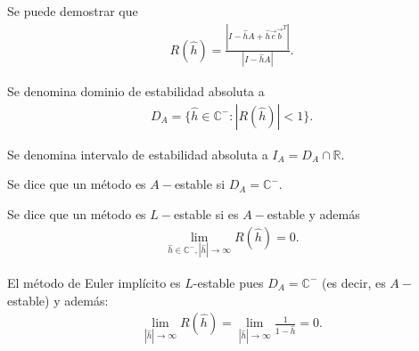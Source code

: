 \begin{obs}
    Se puede demostrar que
    \begin{align*}
        R(\hat{h}) = \frac{|I - \hat{h}A + \hat{h}\overrightarrow{e}\overrightarrow{b}^T|}{|I - \hat{h}A|}.
    \end{align*}
\end{obs}

\begin{defi}
    Se denomina dominio de estabilidad absoluta a
    \begin{align*}
        D_A = \{ \hat{h} \in \mathbb{C}^- : |R(\hat{h})| < 1\}.
    \end{align*}
\end{defi}

\begin{defi}
    Se denomina intervalo de estabilidad absoluta a $I_A = D_A \cap \mathbb{R}$.
\end{defi}

\begin{defi}
    Se dice que un método es $A-$estable si $D_A = \mathbb{C}^-$.
\end{defi}

\begin{defi}
    Se dice que un método es $L-$estable si es $A-$estable y además
    \begin{align*}
        \lim_{\hat{h} \in\mathbb{C}^-, |\hat{h}| \to \infty} R(\hat{h}) = 0.
    \end{align*}
\end{defi}

\begin{ejemplo}
    El método de Euler implícito es $L$-estable pues $D_A = \mathbb{C}^-$ (es decir, es $A-$estable) y además:
    \begin{align*}
        \lim_{|\hat{h}| \to \infty} R(\hat{h}) = \lim_{|\hat{h}| \to \infty} \frac{1}{1- \hat{h}} = 0.
    \end{align*}
\end{ejemplo}

